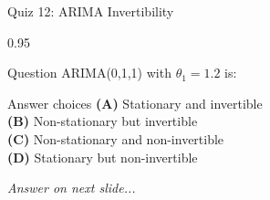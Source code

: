 \documentclass[9pt, aspectratio=169, t]{beamer}
\begin{document}
\begin{frame}{Quiz 12: ARIMA Invertibility}
    \begin{cminipage}{0.95\textwidth}
    \begin{alertblock}{Question}
        ARIMA(0,1,1) with $\theta_1 = 1.2$ is:
    \end{alertblock}

    \vspace{0.4cm}

    \begin{block}{Answer choices}
        \textcolor{MainBlue}{\textbf{(A)}} Stationary and invertible\\[3pt]
        \textcolor{MainBlue}{\textbf{(B)}} Non-stationary but invertible\\[3pt]
        \textcolor{MainBlue}{\textbf{(C)}} Non-stationary and non-invertible\\[3pt]
        \textcolor{MainBlue}{\textbf{(D)}} Stationary but non-invertible
    \end{block}

    \vspace{0.5cm}

    \begin{center}
        \textit{Answer on next slide...}
    \end{center}
    \end{cminipage}
\end{frame}
\end{document}
